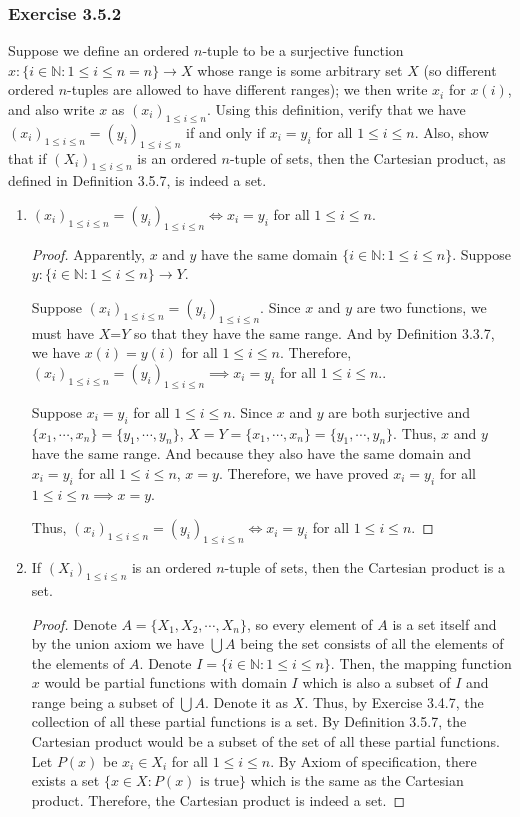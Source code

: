 \documentclass[12pt, letter]{article}
\begin{document}
\subsubsection*{Exercise 3.5.2}
Suppose we define an ordered $n$-tuple to be a surjective function $x:\{i\in \mathbb{N}:1\leq i\leq n= n\}\to X$ whose range is some arbitrary set $X$
(so different ordered $n$-tuples are allowed to have different ranges); we then write $x_i$ for $x(i)$, and also write $x$ as $(x_i)_{1\leq i\leq n}$.
Using this definition, verify that we have $(x_i)_{1\leq i\leq n}=(y_i)_{1\leq i\leq n}$ if and only if $x_i=y_i$ for all $1\leq i\leq n$. Also,
show that if $(X_i)_{1\leq i\leq n}$ is an ordered $n$-tuple of sets, then the Cartesian product, as defined in Definition 3.5.7, is indeed a set.
\begin{enumerate}
    \item $(x_i)_{1\leq i\leq n}=(y_i)_{1\leq i\leq n}\iff x_i=y_i$ for all $1\leq i\leq n$.
    \begin{proof}
        Apparently, $x$ and $y$ have the same domain $\{i\in\mathbb{N}:1\leq i\leq n\}$. Suppose $y:\{i\in \mathbb{N}:1\leq i\leq n\}\to Y$. 

        Suppose $(x_i)_{1\leq i\leq n}=(y_i)_{1\leq i\leq n}$. Since $x$ and $y$ are two functions, we must have $X$=$Y$ so that they have the same range.
        And by Definition 3.3.7, we have $x(i)=y(i)$ for all $1\leq i\leq n$. Therefore, $(x_i)_{1\leq i\leq n}=(y_i)_{1\leq i\leq n}\implies x_i=y_i$ for all $1\leq i\leq n$..
    
        Suppose $x_i=y_i$ for all $1\leq i\leq n$. Since $x$ and $y$ are both surjective and $\{x_1,\cdots, x_n\}=\{y_1,\cdots, y_n\}$, $X=Y=\{x_1,\cdots, x_n\}=\{y_1,\cdots, y_n\}$. 
        Thus, $x$ and $y$ have the same range. And because they also have the same domain and $x_i=y_i$ for all $1\leq i\leq n$, $x=y$. Therefore, we have proved $x_i=y_i$ for all $1\leq i\leq n
        \implies x=y$. 
        
        Thus, $(x_i)_{1\leq i\leq n}=(y_i)_{1\leq i\leq n}\iff x_i=y_i$ for all $1\leq i\leq n$.
    \end{proof} 
    \item If $(X_i)_{1\leq i\leq n}$ is an ordered $n$-tuple of sets, then the Cartesian product is a set.
    \begin{proof}
        Denote $A=\{X_1, X_2,\cdots, X_n\}$, so every element of $A$ is a set itself and by the union axiom we have $\bigcup A$ being the set consists of all the elements of the elements of $A$. 
        Denote $I=\{i\in \mathbb{N}: 1\leq i\leq n\}$. Then, the mapping function $x$ would be partial functions with domain $I$ which is also a subset of $I$ and range being a subset of $\bigcup A$. Denote it as $X$. 
        Thus, by Exercise 3.4.7, the collection of all these partial functions is a set. By Definition 3.5.7, the Cartesian product would be a subset of the set of all these partial functions.
        Let $P(x)$ be $x_i\in X_i$ for all $1\leq i\leq n$. By Axiom of specification, there exists a set $\{x\in X: P(x)\text{ is true}\}$ which is the same 
        as the Cartesian product. Therefore, the Cartesian product is indeed a set.
    \end{proof}
\end{enumerate}
\end{document}
